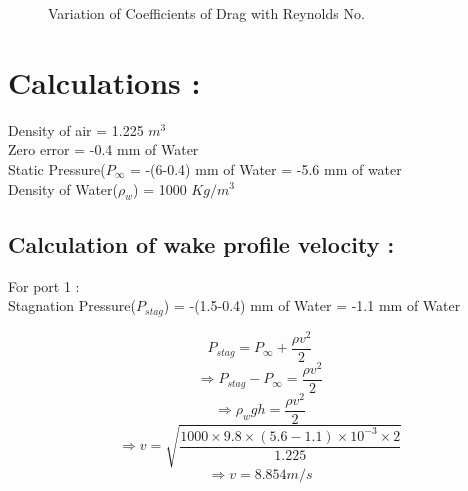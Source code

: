 \documentclass[12pt,a4paper]{article}
\begin{document}
\begin{figure}[!ht]
	\begin{center}
	\end{center}
	\caption{Variation of Coefficients of Drag with Reynolds No.}
\end{figure}

\newpage














\section{Calculations :}
Density of air = 1.225 $m^3$ \\
Zero error = -0.4 mm of Water \\
Static Pressure($P_{\infty}$ = -(6-0.4) mm of Water = -5.6 mm of water \\
Density of Water($\rho_{w}$) = 1000 $Kg/m^3$

\subsection{Calculation of wake profile velocity :}
For port 1 : \\
Stagnation Pressure($P_{stag}$) = -(1.5-0.4) mm of Water = -1.1 mm of Water

$$  P_{stag} = P_{\infty} + \frac{\rho v^2}{2} $$
$$\Rightarrow   P_{stag}-P_{\infty} = \frac{\rho v^2}{2}$$ 
$$\Rightarrow \rho_{w}gh = \frac{\rho v^2}{2} $$
$$\Rightarrow v= \sqrt{\frac{1000\times9.8\times(5.6-1.1)\times 10^{-3} \times2}{1.225}} $$
$$\Rightarrow v = 8.854 m/s $$
\end{document}
